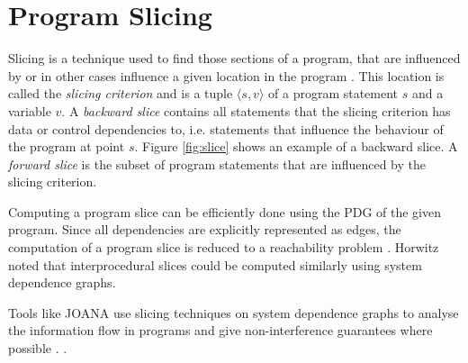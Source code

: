 \section{Program Slicing}


Slicing is a technique used to find those sections of a program, that are influenced by or in other cases influence a given location in the program \cite{weiser81}.
This location is called the \emph{slicing criterion} and is a tuple $\langle s, v \rangle$ of a program statement $s$ and a variable $v$.
A \emph{backward slice} contains all statements that the slicing criterion has data or control dependencies to, i.e. statements that influence the behaviour of the program at point $s$. Figure \ref{fig:slice} shows an example of a backward slice.
A \emph{forward slice} is the subset of program statements that are influenced by the slicing criterion.

Computing a program slice can be efficiently done using the PDG of the given program. Since all dependencies are explicitly represented as edges, the computation of a program slice is reduced to a reachability problem \cite{ottenstein84}. Horwitz \cite{horwitz88sdg} noted that interprocedural slices could be computed similarly using system dependence graphs.

Tools like JOANA use slicing techniques on system dependence graphs to analyse the information flow in programs and give non-interference guarantees where possible \cite{hammer09}. .

